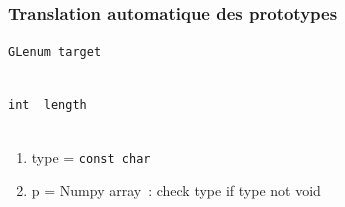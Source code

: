 \begin{frame}
  \frametitle{Translation automatique des prototypes}
  \begin{description}
    \item[simple] \texttt{GLenum target} \\
       \\[.5em]
    \item[output par référence] \texttt{int \alert{\ptr [1]} length} \\
       \\[.5em]
    \item[Pointeur Complexe]
      \begin{enumerate}
      \item type = \texttt{const char \ptr}
      \item p = Numpy array~: check type if type not void
      \end{enumerate}
  \end{description}
  \note{
    \begin{enumerate}
    \item 
    \end{enumerate}
  }
\end{frame}

